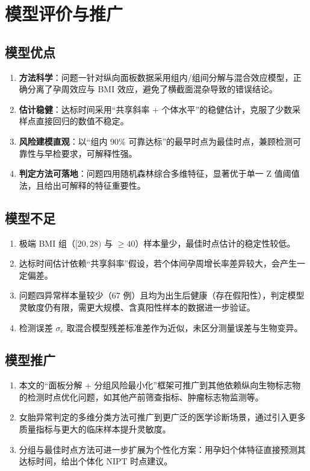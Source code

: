 \section{模型评价与推广}

\subsection{模型优点}

\begin{enumerate}
  \item \textbf{方法科学}：问题一针对纵向面板数据采用组内/组间分解与混合效应模型，正确分离了孕周效应与 BMI 效应，避免了横截面混杂导致的错误结论。
  \item \textbf{估计稳健}：达标时间采用``共享斜率 + 个体水平''的稳健估计，克服了少数采样点直接回归的数值不稳定。
  \item \textbf{风险建模直观}：以``组内 90\% 可靠达标''的最早时点为最佳时点，兼顾检测可靠性与早检要求，可解释性强。
  \item \textbf{判定方法可落地}：问题四用随机森林综合多维特征，显著优于单一 Z 值阈值法，且给出可解释的特征重要性。
\end{enumerate}

\subsection{模型不足}

\begin{enumerate}
  \item 极端 BMI 组（$[20,28)$ 与 $\ge 40$）样本量少，最佳时点估计的稳定性较低。
  \item 达标时间估计依赖``共享斜率''假设，若个体间孕周增长率差异较大，会产生一定偏差。
  \item 问题四异常样本量较少（67 例）且均为出生后健康（存在假阳性），判定模型灵敏度仍有限，需更大规模、含真阳性样本的数据进一步验证。
  \item 检测误差 $\sigma_e$ 取混合模型残差标准差作为近似，未区分测量误差与生物变异。
\end{enumerate}

\subsection{模型推广}

\begin{enumerate}
  \item 本文的``面板分解 + 分组风险最小化''框架可推广到其他依赖纵向生物标志物的检测时点优化问题，如其他产前筛查指标、肿瘤标志物监测等。
  \item 女胎异常判定的多维分类方法可推广到更广泛的医学诊断场景，通过引入更多质量指标与更大的临床样本提升灵敏度。
  \item 分组与最佳时点方法可进一步扩展为个性化方案：用孕妇个体特征直接预测其达标时间，给出个体化 NIPT 时点建议。
\end{enumerate}
